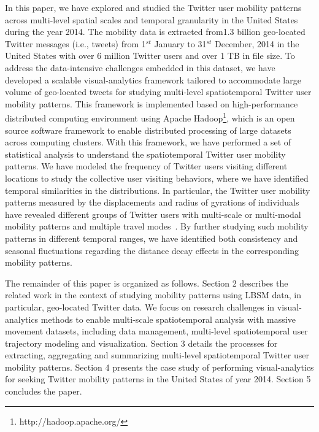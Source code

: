 \documentclass[a4paper, 11pt]{article}
\begin{document}
In this paper, we have explored and studied the Twitter user mobility patterns across multi-level spatial scales and temporal granularity in the United States during the year 2014. 
The mobility data is extracted from1.3 billion geo-located Twitter messages (i.e., tweets) from 1$^{st}$ January to 31$^{st}$ December, 2014 in the United States with over 6 million Twitter users and over 1 TB in file size. 
To address the data-intensive challenges embedded in this dataset, we have developed a scalable visual-analytics framework tailored to accommodate large volume of geo-located tweets for studying multi-level spatiotemporal Twitter user mobility patterns.
This framework is implemented based on high-performance distributed computing environment using Apache Hadoop\footnote{http://hadoop.apache.org/}, which is an open source software framework to enable distributed processing of large datasets across computing clusters.
With this framework, we have performed a set of statistical analysis to understand the spatiotemporal Twitter user mobility patterns. 
We have modeled the frequency of Twitter users visiting different locations to study the collective user visiting behaviors, where we have identified temporal similarities in the distributions. 
In particular, the Twitter user mobility patterns measured by the displacements and radius of gyrations of individuals~\citep{gonzalez2008understanding} have revealed different groups of Twitter users with multi-scale or multi-modal mobility patterns and multiple travel modes~\citep{Jurdak2015}.
By further studying such mobility patterns in different temporal ranges, we have identified both consistency and seasonal fluctuations regarding the distance decay effects in the corresponding mobility patterns. 

The remainder of this paper is organized as follows.
Section 2 describes the related work in the context of studying mobility patterns using LBSM data, in particular, geo-located Twitter data.
We focus on research challenges in visual-analytics methods to enable multi-scale
spatiotemporal analysis with massive movement datasets, including data management, multi-level spatiotemporal user trajectory modeling and visualization.
Section 3 details the processes for extracting, aggregating and summarizing multi-level spatiotemporal Twitter user mobility patterns.
Section 4 presents the case study of performing visual-analytics for seeking Twitter mobility patterns in the United States of year 2014. Section 5 concludes the paper.
\end{document}
